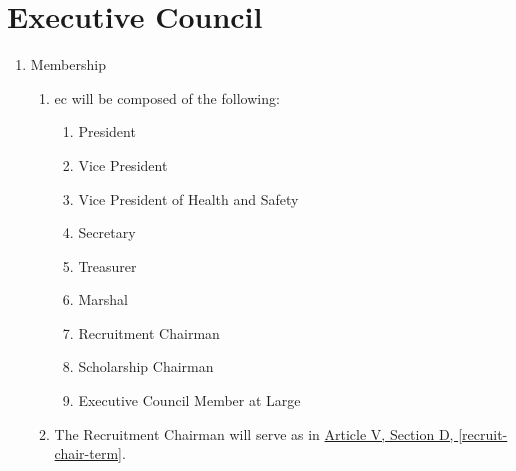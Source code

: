 \section{Executive Council}
	\begin{enumerate}
		\item Membership
			\begin{enumerate}
				\item \Gls{ec} will be composed of the following:
					\begin{enumerate}
						\item President
						\item Vice President
						\item Vice President of Health and Safety
						\item Secretary
						\item Treasurer
						\item Marshal
						\item Recruitment Chairman
                        \item Scholarship Chairman
						\item Executive Council Member at Large
					\end{enumerate}
				\item The Recruitment Chairman will serve as in \hyperref[recruit-chair-term]{Article V, Section D, \autoref*{recruit-chair-term}}.

			\end{enumerate}


\end{enumerate}
